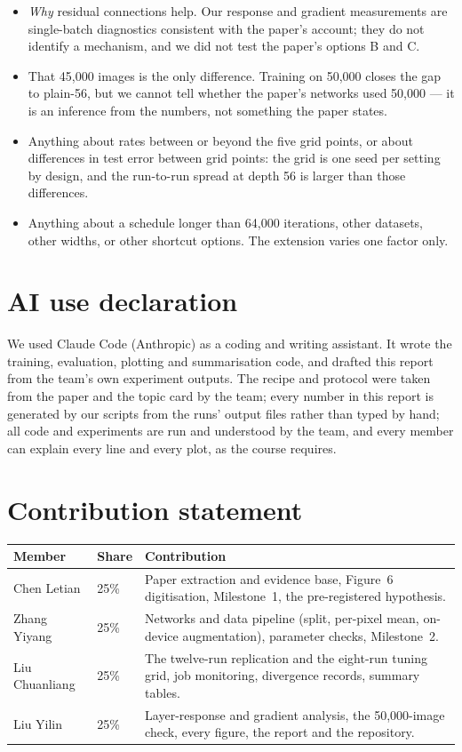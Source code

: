 \documentclass[11pt,a4paper]{article}
\begin{document}
\begin{itemize}
\item \emph{Why} residual connections help. Our response and gradient
measurements are single-batch diagnostics consistent with the paper's account;
they do not identify a mechanism, and we did not test the paper's options B and C.
\item That 45{,}000 images is the only difference. Training on 50{,}000 closes
the gap to plain-56, but we cannot tell whether the paper's networks used 50{,}000
--- it is an inference from the numbers, not something the paper states.
\item Anything about rates between or beyond the five grid points, or about
differences in test error between grid points: the grid is one seed per setting
by design, and the run-to-run spread at depth 56 is larger than those
differences.
\item Anything about a schedule longer than 64{,}000 iterations, other datasets,
other widths, or other shortcut options. The extension varies one factor only.
\end{itemize}

\section*{AI use declaration}
We used Claude Code (Anthropic) as a coding and writing assistant. It wrote the
training, evaluation, plotting and summarisation code, and drafted this report
from the team's own experiment outputs. The recipe and protocol were taken from
the paper and the topic card by the team; every number in this report is
generated by our scripts from the runs' output files rather than typed by hand;
all code and experiments are run and understood by the team, and every member
can explain every line and every plot, as the course requires.

\section*{Contribution statement}

\begin{center}
\begin{tabular}{@{}llp{9.4cm}@{}}
\toprule
\textbf{Member} & \textbf{Share} & \textbf{Contribution} \\
\midrule
Chen Letian & 25\% & Paper extraction and evidence base, Figure~6 digitisation,
Milestone~1, the pre-registered hypothesis. \\
Zhang Yiyang & 25\% & Networks and data pipeline (split, per-pixel mean, on-device
augmentation), parameter checks, Milestone~2. \\
Liu Chuanliang & 25\% & The twelve-run replication and the eight-run tuning grid,
job monitoring, divergence records, summary tables. \\
Liu Yilin & 25\% & Layer-response and gradient analysis, the 50{,}000-image
check, every figure, the report and the repository. \\
\bottomrule
\end{tabular}
\end{center}
\end{document}
